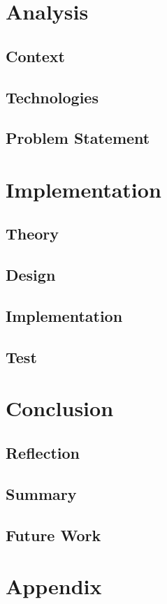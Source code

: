 




 
\tableofcontents



\part{Analysis}

\chapter{Context}

\chapter{Technologies}

\chapter{Problem Statement}


\part{Implementation}

\chapter{Theory}

\chapter{Design}

\chapter{Implementation}

\chapter{Test}


\part{Conclusion}

\chapter{Reflection}

\chapter{Summary}

\chapter{Future Work}


\printbibliography

\part{Appendix}
\appendix

 
 
